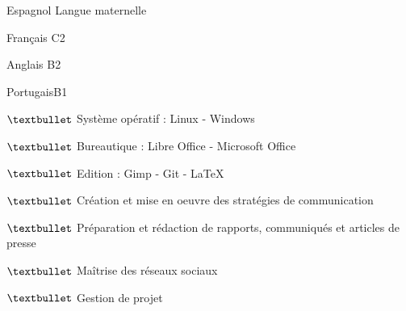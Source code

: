 \begin{skilllist}

\begin{languagelist}
	\item{Espagnol} {Langue maternelle}	
	\item{Français} {C2}	
	\item{Anglais}  {B2}	
	\item{Portugais}{B1}
\end{languagelist}


\begin{stufflist}
    \item{$\textbullet$} {Système opératif : Linux - Windows}
	\item{$\textbullet$} {Bureautique : Libre Office - Microsoft Office}
	\item{$\textbullet$} {Edition : Gimp - Git - \LaTeX}
\end{stufflist}



\begin{stufflist}
    \item{$\textbullet$}  {Création et mise en oeuvre des stratégies de communication}
	\item{$\textbullet$}  {Préparation et rédaction de rapports, communiqués et articles de presse}
	\item{$\textbullet$}  {Maîtrise des réseaux sociaux}
	\item{$\textbullet$}  {Gestion de projet}
\end{stufflist}





\end{skilllist}





